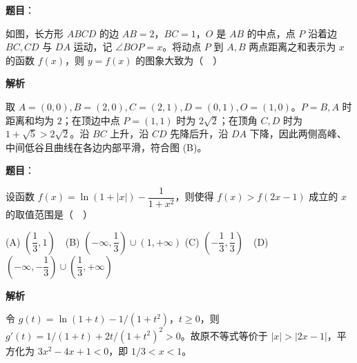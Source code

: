 \begin{answer}

\textbf{题目}：

如图，长方形 $ABCD$ 的边 $AB=2$，$BC=1$，$O$ 是 $AB$ 的中点，点 $P$ 沿着边 $BC,CD$ 与 $DA$ 运动，记 $\angle BOP=x$。将动点 $P$ 到 $A,B$ 两点距离之和表示为 $x$ 的函数 $f(x)$，则 $y=f(x)$ 的图象大致为（　）
\nopagebreak[4]
\begin{center}\end{center}
\nopagebreak[4]
\nopagebreak[4]
\begin{center}\end{center}
\nopagebreak[4]
\nopagebreak[4]
\begin{center}\end{center}
\nopagebreak[4]
\nopagebreak[4]
\begin{center}\end{center}
\nopagebreak[4]
\nopagebreak[4]
\begin{center}\end{center}
\nopagebreak[4]
\textbf{解析}

取 $A=(0,0),B=(2,0),C=(2,1),D=(0,1),O=(1,0)$。$P=B,A$ 时距离和均为 $2$；在顶边中点 $P=(1,1)$ 时为 $2\sqrt2$；在顶角 $C,D$ 时为 $1+\sqrt5>2\sqrt2$。沿 $BC$ 上升，沿 $CD$ 先降后升，沿 $DA$ 下降，因此两侧高峰、中间低谷且曲线在各边内部平滑，符合图 (B)。


\end{answer}
\begin{answer}

\textbf{题目}：

设函数 $f(x)=\ln(1+|x|)-\dfrac1{1+x^2}$，则使得 $f(x)>f(2x-1)$ 成立的 $x$ 的取值范围是（　）

(A) $\left(\dfrac13,1\right)$　(B) $\left(-\infty,\dfrac13\right)\cup(1,+\infty)$  
(C) $\left(-\dfrac13,\dfrac13\right)$　(D) $\left(-\infty,-\dfrac13\right)\cup\left(\dfrac13,+\infty\right)$

\textbf{解析}

令 $g(t)=\ln(1+t)-1/(1+t^2)$，$t\ge0$，则 $g'(t)=1/(1+t)+2t/(1+t^2)^2>0$。故原不等式等价于 $|x|>|2x-1|$，平方化为 $3x^2-4x+1<0$，即 $1/3<x<1$。


\end{answer}
